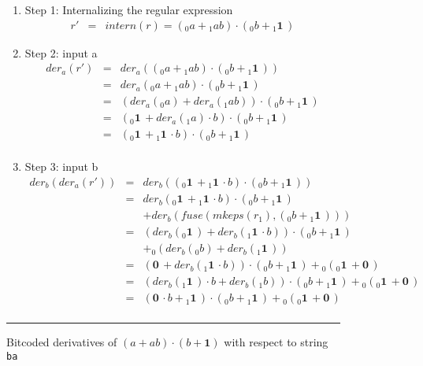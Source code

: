 \documentclass[12pt]{article}
\newcommand{\ZERO}{\textbf{0}}
\newcommand{\ONE}{\textbf{1}}
\newcommand{\der}{\textit{der}}
\newcommand{\fuse}{\textit{fuse}}
\newcommand{\mkeps}{\textit{mkeps}}
\newcommand{\intern}{\textit{intern}}
\begin{document}
\begin{figure}[ht]
\begin{enumerate}
  \item Step 1: Internalizing the regular expression
  \[
    \begin{array}{rcl}
    r' & = & \intern(r) = ({}_0a + {}_1ab) \cdot ({}_0b + {}_1\ONE\,)
    \end{array}
  \]

  \item Step 2: input a
    \[
    \begin{array}{rcl}
    \der_a (r') & =           & \der_a(({}_0a + {}_1ab) \cdot ({}_0b + {}_1\ONE\,))\\
                & =           & \der_a({}_0a + {}_1ab) \cdot ({}_0b + {}_1\ONE\,)\\
                & =           & (\der_a({}_0a) + \der_a({}_1ab)) \cdot ({}_0b + {}_1\ONE\,)\\
                & =           & ({}_0\ONE\, + \der_a({}_1a) \cdot b ) \cdot ({}_0b + {}_1\ONE\,)\\
                & = & ({}_0\ONE\, + {}_1\ONE\, \cdot b) \cdot ({}_0b + {}_1\ONE\,)\\
    \end{array}
    \]

  \item Step 3: input b
  \[
    \begin{array}{rcl}
    \der_b(\der_a(r')) & =           & \der_b(({}_0\ONE\, + {}_1\ONE\, \cdot b) \cdot ({}_0b + {}_1\ONE\,))\\
                       & =           & \der_b({}_0\ONE\, + {}_1\ONE\, \cdot b) \cdot ({}_0b + {}_1\ONE\,) \\
                       &             &+ \der_b(\fuse(\mkeps(r_1),({}_0b + {}_1\ONE\,))) \\
                       & =           & (\der_b({}_0\ONE\,) + \der_b({}_1\ONE\, \cdot b)) \cdot ({}_0b + {}_1\ONE\,) \\
                       &&+ {}_0(\der_b({}_0b) + \der_b({}_1\ONE\,)) \\
                       & =           & (\ZERO\, + \der_b({}_1\ONE\, \cdot b)) \cdot ({}_0b + {}_1\ONE\,) + {}_0({}_0\ONE\, + \ZERO\,) \\
                       & =           & (\der_b({}_1\ONE\,)\cdot b + \der_b({}_1b)) \cdot ({}_0b + {}_1\ONE\,) + {}_0({}_0\ONE\, + \ZERO\,) \\
                       & = & (\ZERO\, \cdot b + {}_1\ONE\,) \cdot ({}_0b + {}_1\ONE\,) + {}_0({}_0\ONE\, + \ZERO\,) \\
    \end{array}
  \]

\end{enumerate}
    \mbox{}
    \hrule
\caption{Bitcoded derivatives of $(a+ab)\cdot (b+\ONE)$ with respect to string \texttt{ba}} \label{BitcodedDerivative}
\end{figure}
\end{document}
